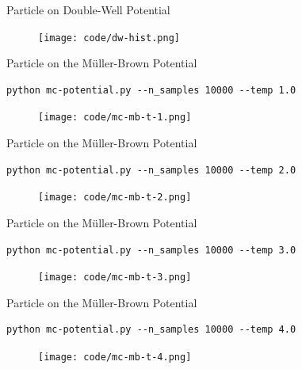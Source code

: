 \documentclass[10pt]{beamer}
\begin{document}
\begin{frame}{Particle on Double-Well Potential}
\begin{figure}
  \texttt{[image: code/dw-hist.png]}
\end{figure}
\end{frame}

\begin{frame}[fragile]{Particle on the M\"uller-Brown Potential}
\begin{lstlisting}
python mc-potential.py --n_samples 10000 --temp 1.0
\end{lstlisting}
\vspace*{-0.3cm}
\begin{figure}
  \texttt{[image: code/mc-mb-t-1.png]}
\end{figure}
\end{frame}

\begin{frame}[fragile]{Particle on the M\"uller-Brown Potential}
\begin{lstlisting}
python mc-potential.py --n_samples 10000 --temp 2.0
\end{lstlisting}
\vspace*{-0.3cm}
\begin{figure}
  \texttt{[image: code/mc-mb-t-2.png]}
\end{figure}
\end{frame}

\begin{frame}[fragile]{Particle on the M\"uller-Brown Potential}
\begin{lstlisting}
python mc-potential.py --n_samples 10000 --temp 3.0
\end{lstlisting}
\vspace*{-0.3cm}
\begin{figure}
  \texttt{[image: code/mc-mb-t-3.png]}
\end{figure}
\end{frame}

\begin{frame}[fragile]{Particle on the M\"uller-Brown Potential}
\begin{lstlisting}
python mc-potential.py --n_samples 10000 --temp 4.0
\end{lstlisting}
\vspace*{-0.3cm}
\begin{figure}
  \texttt{[image: code/mc-mb-t-4.png]}
\end{figure}
\end{frame}
\end{document}
